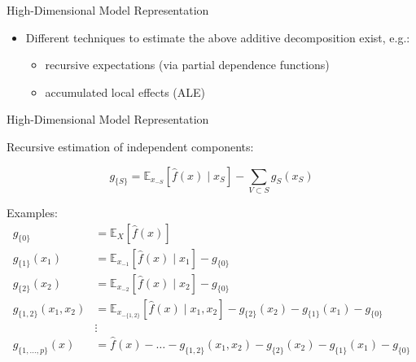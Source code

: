 \documentclass[11pt,compress,t,notes=noshow, aspectratio=169, xcolor=table]{beamer}
\begin{document}
\begin{frame}{High-Dimensional Model Representation }
\begin{itemize}
\item Different techniques to estimate the above additive decomposition exist, e.g.:
		\begin{itemize}
			\item recursive expectations (via partial dependence functions) 
			\item accumulated local effects (ALE)
		\end{itemize}
\end{itemize}
\end{frame}

\begin{frame}{High-Dimensional Model Representation}

Recursive estimation of independent components:

$$g_{\{S\}} = \mathbb{E}_{x_{-S}}\left[\widehat{f}(x) \; \vert  \; x_S \right] - \sum_{V \subset S} g_S(x_S)$$

Examples:
\begin{align*}
 g_{\{0\}} &= \mathbb{E}_X\left[\widehat{f}(x)\right] \\
 g_{\{1\}}(x_1) &= \mathbb{E}_{x_{-1}}\left[\widehat{f}(x) \; \vert  \; x_1 \right] - g_{\{0\}} \\
 g_{\{2\}}(x_2) &= \mathbb{E}_{x_{-2}}\left[\widehat{f}(x) \; \vert  \; x_2 \right] - g_{\{0\}} \\
 g_{\{1, 2\}}(x_1, x_2) &= \mathbb{E}_{x_{-\{1,2\}}}\left[\widehat{f}(x) \; \vert \; x_1, x_2 \right] - g_{\{2\}}(x_2) - g_{\{1\}}(x_1) - g_{\{0\}}\\
 &\vdots \\
 g_{\{1, \dots, p\}}(x) &= \widehat{f}(x) - \dots - g_{\{1, 2\}}(x_1, x_2) %
 - g_{\{2\}}(x_2) - g_{\{1\}}(x_1) - g_{\{0\}}\\
\end{align*}

\end{frame}

\end{document}
